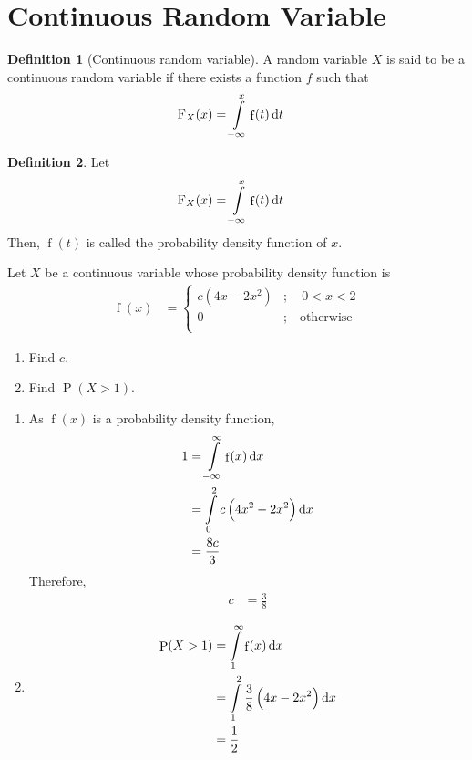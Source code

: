 \documentclass[titlepage, fleqn, a4paper, 12pt, twoside]{article}
\theoremstyle{definition}
\newtheorem{definition}{Definition}
\theoremstyle{theorem}
\DeclareMathOperator{\prob}{\mathrm{P}}
\DeclareMathOperator{\pdf}{\mathrm{f}}
\newcommand*{\cdf}[1]{\mathrm{F}_{#1}}
\begin{document}
\section{Continuous Random Variable}

\begin{definition}[Continuous random variable]
	A random variable $X$ is said to be a continuous random variable if there exists a function $f$ such that
	\begin{align*}
		\cdf{X}(x) & = \int\limits_{-\infty}^{x} \pdf(t) \dif t
	\end{align*}
\end{definition}

\begin{definition}
	Let
	\begin{align*}
		\cdf{X}(x) & = \int\limits_{-\infty}^{x} \pdf(t) \dif t
	\end{align*}
	Then, $\pdf(t)$ is called the probability density function of $x$.
\end{definition}

\begin{question}
	Let $X$ be a continuous variable whose probability density function is
	\begin{align*}
		\pdf(x) &=
			\begin{cases}
				c \left( 4 x - 2 x^2 \right) &;\quad 0 < x < 2\\
				0 &;\quad \text{otherwise}\\
			\end{cases}
	\end{align*}
	\begin{enumerate}
		\item Find $c$.
		\item Find $\prob(X > 1)$.
	\end{enumerate}
\end{question}

\begin{solution}
	\begin{enumerate}[leftmargin=*]
		\item
			As $\pdf(x)$ is a probability density function,
			\begin{align*}
				1 &= \int\limits_{-\infty}^{\infty} \pdf(x) \dif x\\
				&= \int\limits_{0}^{2} c \left( 4 x^2 - 2 x^2 \right) \dif x\\
				&= \frac{8 c}{3}
			\end{align*}
			Therefore,
			\begin{align*}
				c &= \frac{3}{8}
			\end{align*}
		\item
			\begin{align*}
				\prob(X > 1) &= \int\limits_{1}^{\infty} \pdf(x) \dif x\\
				&= \int\limits_{1}^{2} \frac{3}{8} \left( 4 x - 2 x^2 \right) \dif x\\
				&= \frac{1}{2}
			\end{align*}
	\end{enumerate}
\end{solution}
\end{document}
